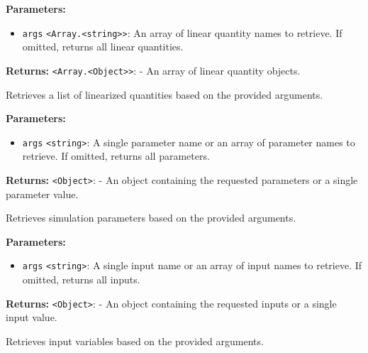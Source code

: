 \documentclass[12pt,a4paper]{article}
\begin{document}
\noindent \textbf{Parameters:}
\begin{itemize}
  \item \texttt{args} \texttt{<Array.<string>>}: An array of linear quantity names to retrieve. If omitted, returns all linear quantities.
\end{itemize}

\noindent \textbf{Returns:} \texttt{<Array.<Object>>}: - An array of linear quantity objects.

\noindent Retrieves a list of linearized quantities based on the provided arguments.

\vspace{5mm}
\noindent {}


\noindent \textbf{Parameters:}
\begin{itemize}
  \item \texttt{args} \texttt{<string>}: A single parameter name or an array of parameter names to retrieve. If omitted, returns all parameters.
\end{itemize}

\noindent \textbf{Returns:} \texttt{<Object>}: - An object containing the requested parameters or a single parameter value.

\noindent Retrieves simulation parameters based on the provided arguments.

\vspace{5mm}
\noindent {}


\noindent \textbf{Parameters:}
\begin{itemize}
  \item \texttt{args} \texttt{<string>}: A single input name or an array of input names to retrieve. If omitted, returns all inputs.
\end{itemize}

\noindent \textbf{Returns:} \texttt{<Object>}: - An object containing the requested inputs or a single input value.

\noindent Retrieves input variables based on the provided arguments.

\vspace{5mm}
\noindent {}
\end{document}
